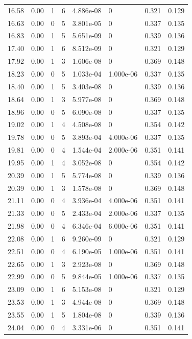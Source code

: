 \documentclass[preview]{standalone}
\begin{document}
{{{\begin{tabular}{L{1.2cm}C{1.2cm} C{0.3cm}C{0.5cm} C{1.4cm}C{1.4cm} C{1.4cm}C{1.4cm}}
  16.58  &  0.00  & 1     &  6 &  4.886e-08  & 0  & 0.321 &  0.129   \\ 
  16.63  &  0.00  & 0     &  5 &  3.801e-05  & 0  & 0.337 &  0.135   \\ 
  16.83  &  0.00  & 1     &  5 &  5.651e-09  & 0  & 0.339 &  0.136   \\ 
  17.40  &  0.00  & 1     &  6 &  8.512e-09  & 0  & 0.321 &  0.129   \\ 
  17.92  &  0.00  & 1     &  3 &  1.606e-08  & 0  & 0.369 &  0.148   \\ 
  18.23  &  0.00  & 0     &  5 &  1.033e-04  & 1.000e-06  & 0.337 &  0.135   \\ 
  18.40  &  0.00  & 1     &  5 &  3.403e-08  & 0  & 0.339 &  0.136   \\ 
  18.64  &  0.00  & 1     &  3 &  5.977e-08  & 0  & 0.369 &  0.148   \\ 
  18.96  &  0.00  & 0     &  5 &  6.090e-08  & 0  & 0.337 &  0.135   \\ 
  19.02  &  0.00  & 1     &  4 &  4.508e-08  & 0  & 0.354 &  0.142   \\ 
  19.78  &  0.00  & 0     &  5 &  3.893e-04  & 4.000e-06  & 0.337 &  0.135   \\ 
  19.81  &  0.00  & 0     &  4 &  1.544e-04  & 2.000e-06  & 0.351 &  0.141   \\ 
  19.95  &  0.00  & 1     &  4 &  3.052e-08  & 0  & 0.354 &  0.142   \\ 
  20.39  &  0.00  & 1     &  5 &  5.774e-08  & 0  & 0.339 &  0.136   \\ 
  20.39  &  0.00  & 1     &  3 &  1.578e-08  & 0  & 0.369 &  0.148   \\ 
  21.11  &  0.00  & 0     &  4 &  3.936e-04  & 4.000e-06  & 0.351 &  0.141   \\ 
  21.33  &  0.00  & 0     &  5 &  2.433e-04  & 2.000e-06  & 0.337 &  0.135   \\ 
  21.98  &  0.00  & 0     &  4 &  6.346e-04  & 6.000e-06  & 0.351 &  0.141   \\ 
  22.08  &  0.00  & 1     &  6 &  9.260e-09  & 0  & 0.321 &  0.129   \\ 
  22.51  &  0.00  & 0     &  4 &  6.190e-05  & 1.000e-06  & 0.351 &  0.141   \\ 
  22.65  &  0.00  & 1     &  3 &  2.923e-08  & 0  & 0.369 &  0.148   \\ 
  22.99  &  0.00  & 0     &  5 &  9.844e-05  & 1.000e-06  & 0.337 &  0.135   \\ 
  23.09  &  0.00  & 1     &  6 &  5.153e-08  & 0  & 0.321 &  0.129   \\ 
  23.53  &  0.00  & 1     &  3 &  4.944e-08  & 0  & 0.369 &  0.148   \\ 
  23.55  &  0.00  & 1     &  5 &  1.804e-08  & 0  & 0.339 &  0.136   \\ 
  24.04  &  0.00  & 0     &  4 &  3.331e-06  & 0  & 0.351 &  0.141   \\ 
\hline 
\end{tabular} 

}}}
\end{document}
